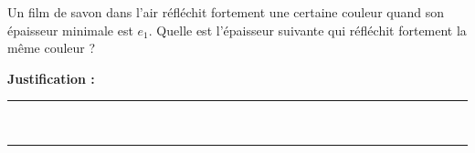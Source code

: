 Un film de savon dans l'air réfléchit fortement une certaine couleur quand son épaisseur minimale est $e_1$. Quelle est l'épaisseur suivante qui réfléchit fortement la même couleur ?

\choices

\noindent\textbf{Justification :} \hrulefill \\[2.5ex]
\rule{\linewidth}{0.4pt} \\[2.5ex]
\rule{\linewidth}{0.4pt}
\vfill
